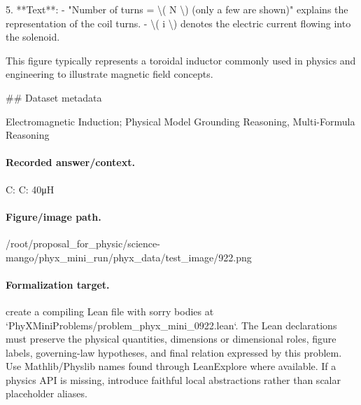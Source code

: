 5. **Text**: 
   - "Number of turns = \textbackslash{}( N \textbackslash{}) (only a few are shown)" explains the representation of the coil turns.
   - \textbackslash{}( i \textbackslash{}) denotes the electric current flowing into the solenoid.

This figure typically represents a toroidal inductor commonly used in physics and engineering to illustrate magnetic field concepts.

\#\# Dataset metadata

Electromagnetic Induction; Physical Model Grounding Reasoning, Multi-Formula Reasoning

\paragraph{Recorded answer/context.}
C: C: 40μH

\paragraph{Figure/image path.}
/root/proposal\_for\_physic/science-mango/phyx\_mini\_run/phyx\_data/test\_image/922.png

\paragraph{Formalization target.}
create a compiling Lean file with sorry bodies at `PhyXMiniProblems/problem\_phyx\_mini\_0922.lean`. The Lean declarations must preserve the physical quantities, dimensions or dimensional roles, figure labels, governing-law hypotheses, and final relation expressed by this problem.
Use Mathlib/Physlib names found through LeanExplore where available. If a physics API is missing, introduce faithful local abstractions rather than scalar placeholder aliases.

